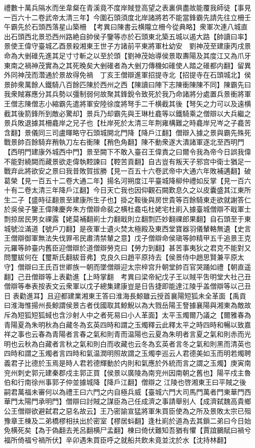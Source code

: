 禮數十萬兵隔水而坐韋粲在青溪竟不度岸賊登高望之表裏俱盡故能覆我師徒【事見一百六十二卷武帝太清三年】今圍石頭須度北岸諸將若不能當鋒霸先請先往立柵壬午霸先於石頭西落星山築柵　【考異曰陳書云横隴立柵今從典略】衆軍次連八城直出石頭西北景恐西州路絶自帥侯子鑒等亦於石頭東北築五城以遏大路【帥讀曰率】景使王偉守臺城乙酉景殺湘東王世子方諸前平東將軍杜幼安　劉神茂至建康丙戌景命為大剉碓先進其足寸寸斬之以至於頭【劉神茂始導侯景取夀陽及其度江又為爪牙東南之禍神茂實為之其死晚矣大剉碓者為大剉刀傳機如碓使人踏之碓都内翻】留異外同神茂而濳通於景故得免禍　丁亥王僧辯進軍招提寺北【招提寺在石頭城北】侯景帥衆萬餘人鐵騎八百餘匹陳於西州之西【陳讀曰陣下志陳衝陳陳不同】陳霸先曰我衆賊寡應分其兵勢以彊制弱何故聚其鋒銳令致死於我乃命諸將分處置兵景衝將軍王僧志陳僧志小縮霸先遣將軍安陸徐度將弩手二千横截其後【弩矢之力可以及遠横截其後箭鋒所到敵必驚却】景兵乃却霸先與王琳杜龕等以鐵騎乘之僧辯以大兵繼之景兵敗退據其柵龕岸之兄子也【杜岸死於太清三年荆雍構難之時龕岸兄岑之子龕苦含翻】景儀同三司盧暉略守石頭城開北門降【降戶江翻】僧辯入據之景與霸先殊死戰景帥百餘騎弃矟執刀左右衝陳【矟色角翻】陳不動衆遂大潰諸軍逐北至西明門【西明門建康外城西中門】景至闕下不敢入臺召王偉責之曰爾令我為帝今日誤我偉不能對繞闕而藏景欲走偉執鞚諫曰【鞚苦貢翻】自古豈有叛天子邪宫中衛士猶足一戰弃此將欲安之景曰我昔敗賀拔勝【見一百五十六卷武帝中大通六年敗補邁翻】破葛榮【見一百五十二卷大通二年】揚名河朔度江平臺城降柳仲禮如反掌【見一百六十有二卷太清三年降戶江翻】今日天亡我也因仰觀石闕歎息久之以皮囊盛其江東所生二子【盛時征翻景至建康所生子也】掛之鞍後與房世貴等百餘騎東走欲就謝答仁於吳侯子鑒王偉陳慶奔朱方僧辯命裴之横杜龕屯杜姥宅杜崱入據臺城僧辯不戢軍士剽掠居民男女祼露【姥莫補翻崱士力翻戢則立翻剽匹妙翻祼郎果翻】自石頭至于東城號泣滿道【號戶刀翻】是夜軍士遺火焚太極殿及東西堂寶器羽儀輦輅無遺【史言王僧辯御軍無法失伐罪弔民肅清禁輦之意】戊子僧辯命侯瑱等帥精甲五千追景王克元羅等帥臺内舊臣迎僧辯於道僧辯勞克曰【勞力到翻】甚苦事夷狄之君克不能對又問璽紱何在【璽斯氏翻紱音弗】克良久曰趙平原持去【侯景侍中趙思賢兼平原太守】僧辯曰王氏百世卿族一朝而墜僧辯迎太宗梓宫升朝堂帥百官哭踊如禮【朝直遥翻】己丑僧辯等上表勸進【上時掌翻　考異曰梁帝紀戊子王以賊平吿明堂大社己丑僧辯等奉表按表文云衆軍以戊子總集建康豈是日告捷即能達江陵乎盖僧辯等以己丑日表勸進耳】且迎都建業湘東王答曰淮海長鯨雖云授首襄陽短狐未全革面【禹貢曰淮海惟揚州長鯨謂侯景古者伐國取其鯨鯢以為大戮岳陽王詧據襄陽與湘東為敵故斥為短狐短狐蜮也含沙射人中之者死易曰小人革面】太平玉燭爾乃議之【爾雅春為青陽夏為朱明秋為白藏冬為玄英四時和謂之玉燭釋云此釋太平之時四時和暢以致嘉祥之事也云春為青陽者言春之氣和則青而温陽也云夏為朱明者言夏之氣和則赤而光明也云秋為白藏者言秋之氣和則白而收藏也云冬為玄英者言冬之氣和則黑而清英也四時和謂之玉燭者言四時和氣温潤明照故謂之玉燭李巡云人君德美如玉而明若燭聘義君子比德於玉焉是時人君若德輝動於内則和氣應於外統而言之謂之玉燭】庚寅南兖州刺史郭元建秦郡戍主郭正買【侯景以廣陵為南兖州因南朝之舊也】陽平戍主魯伯和行南徐州事郭子仲並據城降【降戶江翻】僧辯之江陵也啓湘東王曰平賊之後嗣君萬福未審何以為禮王曰六門之内自極兵威【臺城六門大司馬門萬者門東華門西華門太陽門承明門】僧辯曰討賊之謀臣為己任成濟之事請舉别人【成濟弑魏高貴鄉公王僧辯欲避弑君之惡名故云】王乃密諭宣猛將軍朱買臣使為之所及景敗太宗已殂豫章王棟及二弟橋樛相扶出於密室【樛居蚪翻】逢杜崱於道為去其鎻二弟曰今日始免横死矣【為于偽翻去羌呂翻横尸孟翻】棟曰倚伏難知吾猶有懼【賈誼鵩賦曰禍兮福所倚福兮禍所伏】辛卯遇朱買臣呼之就船共飲未竟並沈於水【沈持林翻】